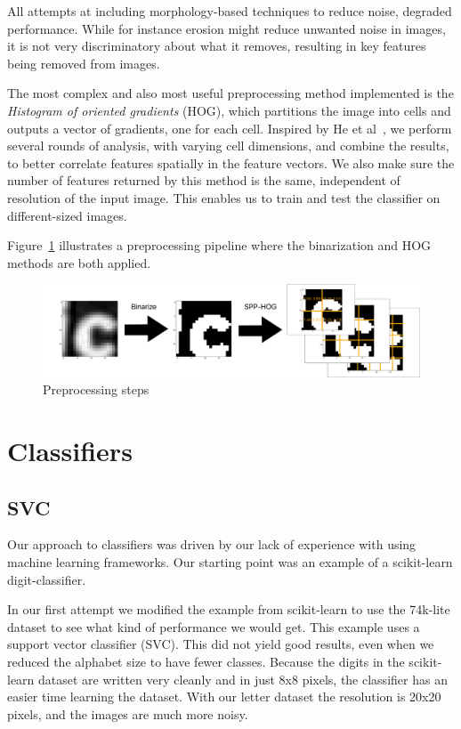 \documentclass[paper=a4, fontsize=11pt]{scrartcl} %
\numberwithin{equation}{section} %
\numberwithin{figure}{section} %
\numberwithin{table}{section} %
\begin{document}
All attempts at including morphology-based techniques to reduce noise,
degraded performance.  While for instance erosion might reduce
unwanted noise in images, it is not very discriminatory about what it
removes, resulting in key features being removed from images.

The most complex and also most useful preprocessing method implemented is the \textit{Histogram of oriented gradients} (HOG),
which partitions the image into cells and
outputs a vector of gradients, one for each cell.  Inspired by He et
al~\cite{bib:spp}, we perform several rounds of analysis, with varying
cell dimensions, and combine the results, to better correlate features
spatially in the feature vectors.
We also make sure the number of features returned by this method is the same,
independent of resolution of the input image.
This enables us to train and test the classifier on different-sized images.

Figure~\ref{fig:preprocessing} illustrates a preprocessing pipeline where the binarization and HOG methods are both applied.

\begin{figure}[H]
    \centering
    \includegraphics[width=0.8\linewidth]{img/preprocessing.pdf}
    \caption{Preprocessing steps} \label{fig:preprocessing}
\end{figure}

\section{Classifiers}
\subsection{SVC}
Our approach to classifiers was driven by our lack of experience with
using machine learning frameworks.
Our starting point was an example of a scikit-learn digit-classifier.

In our first attempt we modified the example from scikit-learn to
use the 74k-lite dataset to see what kind of performance we
would get.
This example uses a support vector classifier (SVC).
This did not yield good results, even when we reduced the alphabet size to have fewer classes.
Because the digits in the scikit-learn dataset are written very cleanly and in just 8x8 pixels,
the classifier has an easier time learning the dataset.
With our letter dataset the resolution is 20x20 pixels, and the images are much more noisy.
\end{document}
